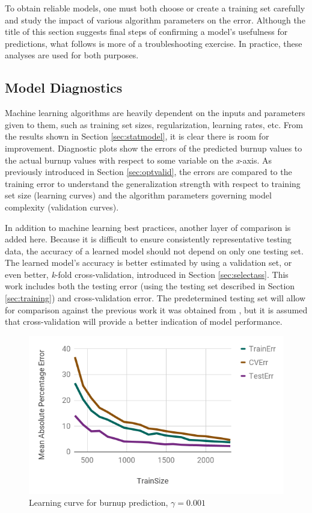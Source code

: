 To obtain reliable models, one must both choose or create a training set
carefully and study the impact of various algorithm parameters on the error.
Although the title of this section suggests final steps of confirming a model's
usefulness for predictions, what follows is more of a troubleshooting exercise. 
In practice, these analyses are used for both purposes.

\subsection{Model Diagnostics}
\label{sec:algeval}

Machine learning algorithms are heavily dependent on the inputs and parameters
given to them, such as training set sizes, regularization, learning rates, etc.
From the results shown in Section \ref{sec:statmodel}, it is clear there is
room for improvement.  Diagnostic plots show the errors of the predicted
burnup values to the actual burnup values with respect to some variable on the
\textit{x}-axis.  As previously introduced in Section \ref{sec:optvalid}, the
errors are compared to the training error to understand the generalization
strength with respect to training set size (learning curves) and the algorithm
parameters governing model complexity (validation curves). 

In addition to machine learning best practices, another layer of comparison is
added here.  Because it is difficult to ensure consistently representative
testing data, the accuracy of a learned model should not depend on only one
testing set.  The learned model's accuracy is better estimated by using a
validation set, or even better, \textit{k}-fold cross-validation, introduced in
Section \ref{sec:selectass}. This work includes both the testing error (using
the testing set described in Section \ref{sec:training}) and cross-validation
error. The predetermined testing set will allow for comparison against the
previous work it was obtained from \cite{dayman_feasibility_2013}, but it is
assumed that cross-validation will provide a better indication of model
performance.

\begin{figure}[!htb]
    \centering
    \includegraphics[width=\linewidth]{./chapters/demo_method/lc1.png}
    \caption{Learning curve for burnup prediction, $\gamma = 0.001$}
    \label{fig:lc1}
\end{figure}

